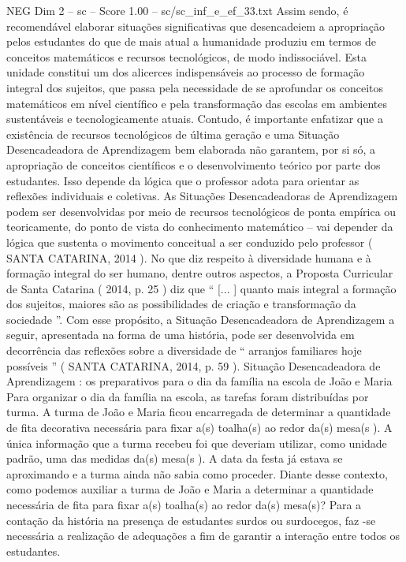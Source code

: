 \begin{textsample}{NEG Dim 2 – sc – Score 1.00 – sc/sc\_inf\_e\_ef\_33.txt}
Assim sendo, é recomendável elaborar situações significativas que desencadeiem a apropriação pelos estudantes do que de mais atual a humanidade produziu em termos de conceitos matemáticos e recursos tecnológicos, de modo indissociável.
Esta unidade constitui um dos alicerces indispensáveis ao processo de formação integral dos sujeitos, que passa pela necessidade de se aprofundar os conceitos matemáticos em nível científico e pela transformação das escolas em ambientes sustentáveis e tecnologicamente atuais.
Contudo, é importante enfatizar que a existência de recursos tecnológicos de última geração e uma Situação Desencadeadora de Aprendizagem bem elaborada não garantem, por si só, a apropriação de conceitos científicos e o desenvolvimento teórico por parte dos estudantes.
Isso depende da lógica que o professor adota para orientar as reflexões individuais e coletivas.
As Situações Desencadeadoras de Aprendizagem podem ser desenvolvidas por meio de recursos tecnológicos de ponta empírica ou teoricamente, do ponto de vista do conhecimento matemático – vai depender da lógica que sustenta o movimento conceitual a ser conduzido pelo professor ( SANTA CATARINA, 2014 ).
No que diz respeito à diversidade humana e à formação integral do ser humano, dentre outros aspectos, a Proposta Curricular de Santa Catarina ( 2014, p. 25 ) diz que “ [... ] quanto mais integral a formação dos sujeitos, maiores são as possibilidades de criação e transformação da sociedade ”.
Com esse propósito, a Situação Desencadeadora de Aprendizagem a seguir, apresentada na forma de uma história, pode ser desenvolvida em decorrência das reflexões sobre a diversidade de “ arranjos familiares hoje possíveis ” ( SANTA CATARINA, 2014, p. 59 ).
Situação Desencadeadora de Aprendizagem : os preparativos para o dia da família na escola de João e Maria Para organizar o dia da família na escola, as tarefas foram distribuídas por turma.
A turma de João e Maria ficou encarregada de determinar a quantidade de fita decorativa necessária para fixar a(s) toalha(s) ao redor da(s) mesa(s ).
A única informação que a turma recebeu foi que deveriam utilizar, como unidade padrão, uma das medidas da(s) mesa(s ).
A data da festa já estava se aproximando e a turma ainda não sabia como proceder.
Diante desse contexto, como podemos auxiliar a turma de João e Maria a determinar a quantidade necessária de fita para fixar a(s) toalha(s) ao redor da(s) mesa(s)?
Para a contação da história na presença de estudantes surdos ou surdocegos, faz -se necessária a realização de adequações a fim de garantir a interação entre todos os estudantes.

\end{textsample}
